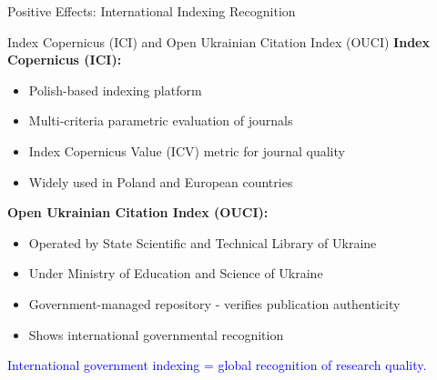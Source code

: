 \documentclass[11pt]{beamer}
\begin{document}
	\begin{frame}{Positive Effects: International Indexing Recognition}
		\scriptsize
		\begin{block}{Index Copernicus (ICI) and Open Ukrainian Citation Index (OUCI)}
			\textbf{Index Copernicus (ICI):}
			\begin{itemize}
				\item Polish-based indexing platform
				\item Multi-criteria parametric evaluation of journals
				\item Index Copernicus Value (ICV) metric for journal quality
				\item Widely used in Poland and European countries
			\end{itemize}
			\textbf{Open Ukrainian Citation Index (OUCI):}
			\begin{itemize}
				\item Operated by State Scientific and Technical Library of Ukraine
				\item Under Ministry of Education and Science of Ukraine
				\item Government-managed repository - verifies publication authenticity
				\item Shows international governmental recognition
			\end{itemize}
			\textcolor{blue}{International government indexing = global recognition of research quality.}
		\end{block}
	\end{frame}
	
	
	
\end{document}
